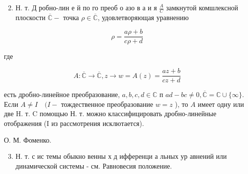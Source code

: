 \documentclass[10pt]{article}
\begin{document}
\begin{enumerate}

  \setcounter{enumi}{1}

  \item Н. т. Д робно-лин е й по го преоб о азо в а и я $\frac{A}{C}$ замкнутой комшлексной плоскости $\overline{\mathbb{C}}-$ точка $\rho \in \overline{\mathbb{C}}$, удовлетворяющая уравнению

\end{enumerate}



\[

\rho=\frac{a \rho+b}{c \rho+d}

\]



где



\[

A: \overline{\mathbb{C}} \longrightarrow \overline{\mathbb{C}}, z \longrightarrow w=A(z)=\frac{a z+b}{c z+d}

\]



есть дробно-линейное преобразование, $a, b, c, d \in \mathbb{C}$ п $a d-b c \neq 0, \overline{\mathbb{C}}=\mathbb{C} \cup\{\infty\}$. Если $A \neq I \quad(I-$ тождественное преобразование $w=z$ ), то $A$ имеет одну или две H. т. C помощью Н. т. можно классифицировать дробно-линейные отображения (I из рассмотрения исклютается).



О. М. Фоменко.



\begin{enumerate}

  \setcounter{enumi}{2}

  \item Н. т. с ис темы обыкно венны х д ифференци а льных ур авнений или динамической системы - см. Равновесия положение.

\end{enumerate}
\end{document}
